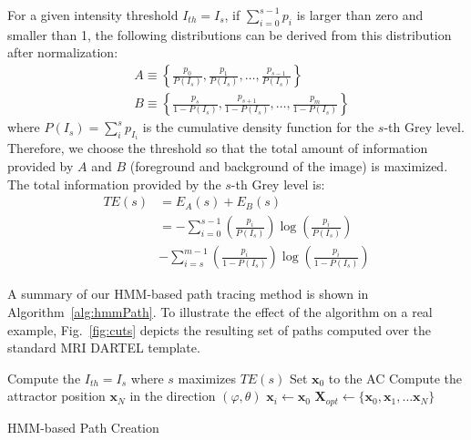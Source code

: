 For a given intensity threshold $I_{th}=I_s$, if $\sum_{i=0}^{s-1}p_i$ is larger than zero and smaller than 1, the following distributions can be derived from this distribution after normalization:
\begin{align}
& A \equiv \left\{\frac{p_0}{P(I_{s})}, \frac{p_1}{P(I_{s})}, \dots, \frac{p_{s-1}}{P(I_{s})} \right\}\\
& B \equiv \left\{\frac{p_{s}}{1-P(I_{s})}, \frac{p_{s+1}}{1-P(I_{s})}, \dots, \frac{p_m}{1-P(I_{s})} \right\}
\end{align}
where $P(I_s) = \sum_{i}^{s}p_{I_i}$ is the cumulative density function for the $s$-th Grey level. Therefore, we choose the threshold so that the total amount of information provided by $A$ and $B$ (foreground and background of the image) is maximized. The total information provided by the $s$-th Grey level is: 
\begin{align}
TE(s) & = E_A(s) + E_B(s) \\
& = -\sum_{i=0}^{s-1}\left(\frac{p_i}{P(I_s)}\right)\log\left(\frac{p_i}{P(I_s)}\right) \\
& - \sum_{i=s}^{m-1}\left(\frac{p_i}{1-P(I_s)}\right)\log\left(\frac{p_i}{1-P(I_s)}\right)
\end{align}

A summary of our \ac{HMM}-based path tracing method is shown in Algorithm~\ref{alg:hmmPath}. To illustrate the effect of the algorithm on a real example, Fig.~\ref{fig:cuts} depicts the resulting set of paths computed over the standard MRI DARTEL template. 

\begin{algorithm*}
	\BlankLine
	Compute the $I_{th} = I_s$ where $s$ maximizes $TE(s)$\;
	Set $\mathbf{x}_0$ to the AC\;
	Compute the attractor position $\mathbf{x}_N$ in the direction $(\varphi, \theta)$\;
	$\mathbf{x}_i \leftarrow \mathbf{x}_0$\;
	$\mathbf{X}_{opt}\leftarrow \{\mathbf{x}_0, \mathbf{x}_1, \dots \mathbf{x}_N\}$\; 
	
	\caption[\acs{HMM}-based Path Creation]{\ac{HMM}-based Path Creation}\label{alg:hmmPath}
\end{algorithm*}\DecMargin{1em}


